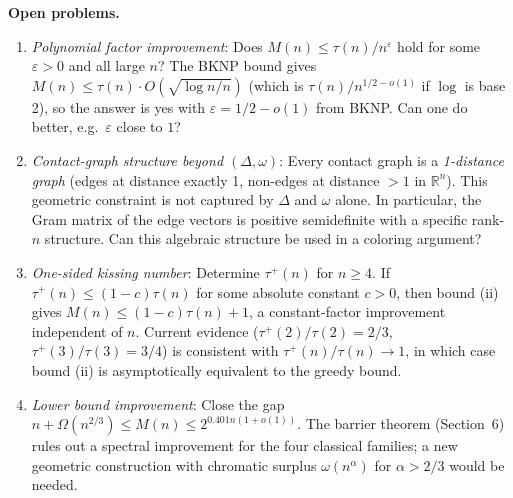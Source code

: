 \medskip
\textbf{Open problems.}
\begin{enumerate}
\item[\textup{(1)}] \emph{Polynomial factor improvement}: Does $M(n)\le\tau(n)/n^{\varepsilon}$ hold for some $\varepsilon>0$ and all large $n$?  The BKNP bound gives $M(n)\le\tau(n)\cdot O(\sqrt{\log n/n})$ (which is $\tau(n)/n^{1/2-o(1)}$ if $\log$ is base 2), so the answer is yes with $\varepsilon = 1/2 - o(1)$ from BKNP.  Can one do better, e.g.\ $\varepsilon$ close to $1$?

\item[\textup{(2)}] \emph{Contact-graph structure beyond $(\Delta,\omega)$}: Every contact graph is a \emph{1-distance graph} (edges at distance exactly 1, non-edges at distance $>1$ in $\mathbb{R}^n$).  This geometric constraint is not captured by $\Delta$ and $\omega$ alone.  In particular, the Gram matrix of the edge vectors is positive semidefinite with a specific rank-$n$ structure.  Can this algebraic structure be used in a coloring argument?

\item[\textup{(3)}] \emph{One-sided kissing number}: Determine $\tau^+(n)$ for $n\ge 4$.  If $\tau^+(n)\le(1-c)\tau(n)$ for some absolute constant $c>0$, then bound (ii) gives $M(n)\le(1-c)\tau(n)+1$, a constant-factor improvement independent of $n$.  Current evidence ($\tau^+(2)/\tau(2)=2/3$, $\tau^+(3)/\tau(3)=3/4$) is consistent with $\tau^+(n)/\tau(n)\to 1$, in which case bound (ii) is asymptotically equivalent to the greedy bound.

\item[\textup{(4)}] \emph{Lower bound improvement}: Close the gap $n+\Omega(n^{2/3})\le M(n)\le 2^{0.401n(1+o(1))}$.  The barrier theorem (Section~6) rules out a spectral improvement for the four classical families; a new geometric construction with chromatic surplus $\omega(n^\alpha)$ for $\alpha>2/3$ would be needed.
\end{enumerate}
